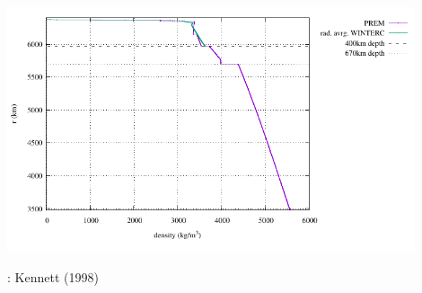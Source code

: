 
\includegraphics[width=12cm]{images/density_profile/density_profile}

\Literature: Kennett (1998) \cite{kenn98}
